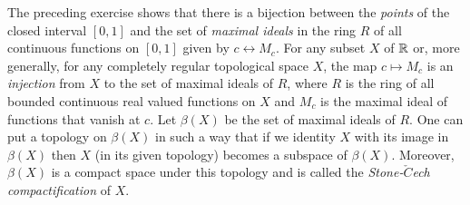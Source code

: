 \noindent The preceding exercise shows that there is a bijection between the
\textit{points} of the closed interval $[0, 1]$ and the set of
\textit{maximal ideals} in the ring $R$ of all continuous functions on $[0, 1]$
given by $c \leftrightarrow M_c$. For any subset $X$ of $\mathbb{R}$ or, more generally,
for any completely regular topological space $X$, the map $c \mapsto M_c$ is an
\textit{injection} from $X$ to the set of maximal ideals of $R$, where $R$ is
the ring of all bounded continuous real valued functions on $X$ and $M_c$ is the 
maximal ideal of functions that vanish at $c$. Let $\beta(X)$ be the set of
maximal ideals of $R$. One can put a topology on $\beta(X)$ in such a way that
if we identity $X$ with its image in $\beta(X)$ then $X$ (in its given topology)
becomes a subspace of $\beta(X)$. Moreover, $\beta(X)$ is a compact space under
this topology and is called the \textit{Stone-$\check{C}$ech compactification}
of $X$.

